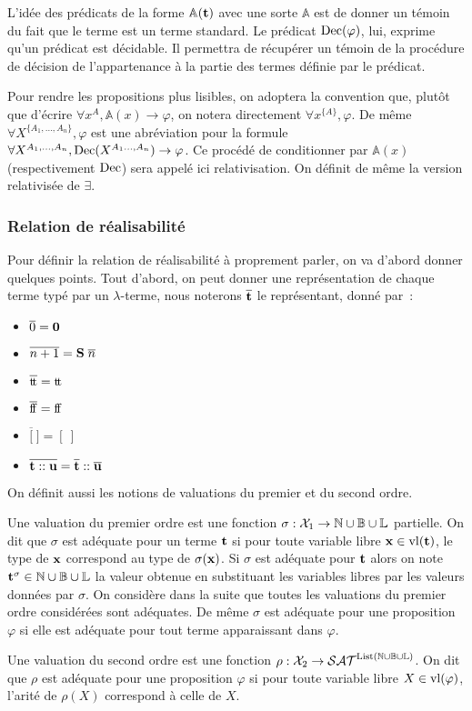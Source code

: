 \documentclass{article}
\begin{document}
L'idée des prédicats de la forme $\mathbb A(\mathbf{t})$ avec une sorte $\mathbb A$ est de donner un témoin du fait que le terme est un terme standard. Le prédicat $\mathrm{Dec}(\varphi)$, lui, exprime qu'un prédicat est décidable. Il permettra de récupérer un témoin de la procédure de décision de l'appartenance à la partie des termes définie par le prédicat.

\begin{nota}
  Pour rendre les propositions plus lisibles, on adoptera la convention que, plutôt que d'écrire $\forall x^A, \mathbb A(x) \to \varphi$, on notera directement $\forall x^{\{A\}}, \varphi$. De même $\forall X^{\{A_1,\ldots,A_n\}}, \varphi$ est une abréviation pour la formule $\forall X^{A_1,\ldots,A_n},\mathrm{Dec}(X^{A_1\ldots,A_n})\to \varphi$. Ce procédé de conditionner par $\mathbb A(x)$ (respectivement $\mathrm{Dec}$) sera appelé ici relativisation. On définit de même la version relativisée de $\exists$.
\end{nota}

\subsubsection{Relation de réalisabilité}

Pour définir la relation de réalisabilité à proprement parler, on va d'abord donner quelques points. Tout d'abord, on peut donner une représentation de chaque terme typé par un $\lambda$-terme, nous noterons $\overline {\mathbf{t}}$ le représentant, donné par~:
\begin{itemize}
\item $\overline 0 = \boldsymbol 0$
\item $\overline{n + 1} = \mathbf{S}\;\overline n$
\item $\overline {\mathrm{t}\!\mathrm{t}} = \mathrm{t}\!\mathrm{t}$
\item $\overline {\mathrm{f}\!\mathrm{f}} = \mathrm{f}\!\mathrm{f}$
\item $\overline [\:] = [\:]$
\item $\overline{\mathbf{t}:: \mathbf{u}} = \overline{\mathbf{t}} :: \overline{\mathbf{u}}$
\end{itemize}

On définit aussi les notions de valuations du premier et du second ordre.

\begin{defi}[Valuation]
  Une valuation du premier ordre est une fonction $\sigma : \mathcal X_1 \to \mathbb{N}\cup \mathbb{B}\cup\mathbb{L}$ partielle. On dit que $\sigma$ est adéquate pour un terme $\mathbf{t}$ si pour toute variable libre $\mathbf{x}\in \mathrm{vl}(\mathbf{t})$, le type de $\mathbf{x}$ correspond au type de $\sigma(\mathbf{x})$. Si $\sigma$ est adéquate pour $\mathbf{t}$ alors on note $\mathbf{t}^\sigma \in \mathbb{N}\cup\mathbb{B}\cup\mathbb{L}$ la valeur obtenue en substituant les variables libres par les valeurs données par $\sigma$. On considère dans la suite que toutes les valuations du premier ordre considérées sont adéquates. De même $\sigma$ est adéquate pour une proposition $\varphi$ si elle est adéquate pour tout terme apparaissant dans $\varphi$.

  Une valuation du second ordre est une fonction $\rho : \mathcal X_2\to \mathcal {SAT}^{\mathrm{List}(\mathbb{N}\cup\mathbb{B}\cup\mathbb{L})}$. On dit que $\rho$ est adéquate pour une proposition $\varphi$ si pour toute variable libre $X\in\mathrm{vl}(\varphi)$, l'arité de $\rho(X)$ correspond à celle de $X$.
\end{defi}
\end{document}
